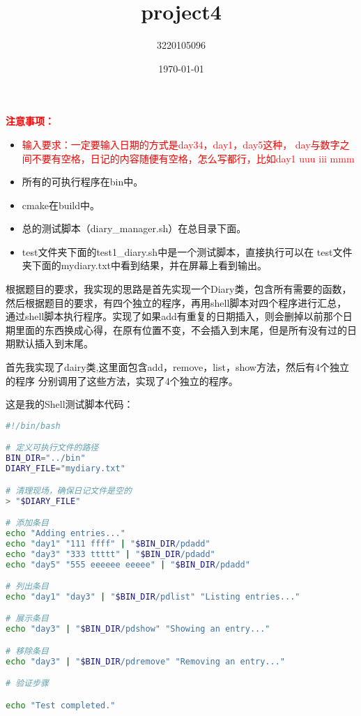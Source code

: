 \documentclass{ctexart} %
\title{project4}
\author{3220105096}
\date{\today}
\begin{document}
\maketitle %
\textbf{\large \textcolor{red} {注意事项：} }
\begin{large}
\begin{itemize}[itemsep=0pt, parsep=0pt]
    \item \textcolor{red} {输入要求：一定要输入日期的方式是day34，day1，day5这种，
        day与数字之间不要有空格，日记的内容随便有空格，怎么写都行，比如day1 uuu iii mmm}
    \item 所有的可执行程序在bin中。
    \item cmake在build中。
    \item 总的测试脚本（diary\_manager.sh）在总目录下面。
    \item test文件夹下面的test1\_diary.sh中是一个测试脚本，直接执行可以在
            test文件夹下面的mydiary.txt中看到结果，并在屏幕上看到输出。
\end{itemize}
\end{large}


\vspace{10pt}

根据题目的要求，我实现的思路是首先实现一个Diary类，包含所有需要的函数，
然后根据题目的要求，有四个独立的程序，再用shell脚本对四个程序进行汇总，
通过shell脚本执行程序。实现了如果add有重复的日期插入，则会删掉以前那个日
期里面的东西换成心得，在原有位置不变，不会插入到末尾，但是所有没有过的日期默认插入到末尾。

\vspace{10pt}

首先我实现了dairy类,这里面包含add，remove，list，show方法，然后有4个独立的程序
分别调用了这些方法，实现了4个独立的程序。

\vspace{10pt}
这是我的Shell测试脚本代码：

\begin{lstlisting}[language=bash, caption=测试代码的脚本]
#!/bin/bash

# 定义可执行文件的路径
BIN_DIR="../bin"
DIARY_FILE="mydiary.txt"

# 清理现场，确保日记文件是空的
> "$DIARY_FILE"

# 添加条目
echo "Adding entries..."
echo "day1" "111 ffff" | "$BIN_DIR/pdadd"
echo "day3" "333 ttttt" | "$BIN_DIR/pdadd"
echo "day5" "555 eeeeee eeeee" | "$BIN_DIR/pdadd"

# 列出条目
echo "day1" "day3" | "$BIN_DIR/pdlist" "Listing entries..." 

# 展示条目
echo "day3" | "$BIN_DIR/pdshow" "Showing an entry..." 

# 移除条目
echo "day3" | "$BIN_DIR/pdremove" "Removing an entry..."

# 验证步骤

echo "Test completed."
\end{lstlisting}
\end{document}
